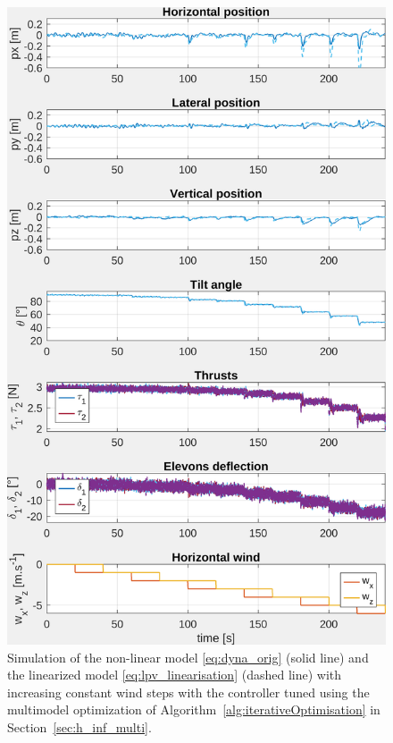 \begin{figure}[t!]
    \centering
    \includegraphics[trim=0cm 0cm 0cm 0cm,clip,width=0.9\columnwidth]{figures/sim_systune_lpv_noise.png}
    \caption{Simulation of the non-linear model \eqref{eq:dyna_orig} (solid line) and the linearized model  \eqref{eq:lpv_linearisation} (dashed line) with increasing constant wind steps with the controller tuned using the multimodel optimization of Algorithm~\ref{alg:iterativeOptimisation} in  Section~\ref{sec:h_inf_multi}.}
    \label{fig:SimSytuneStruct_lpv}
\end{figure}

